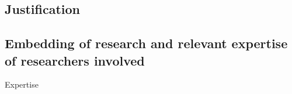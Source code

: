 \documentclass[a4paper,10pt,fleqn]{application}
\begin{document}
\subsection{Justification}



\subsection{Embedding of research and relevant expertise of researchers involved}

Expertise
\end{document}
